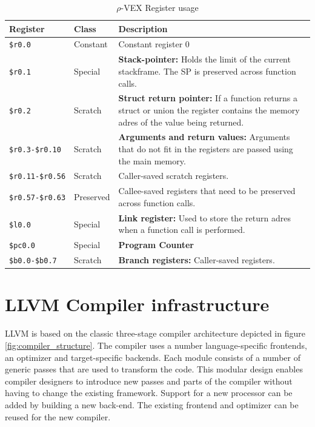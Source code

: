 \begin{table}
  \centering
    \begin{tabular}{|l|l|p{10cm}|}
    \hline
    \textbf{Register} & \textbf{Class} & \textbf{Description}   \\ \hline
    \texttt{\$r0.0}         & Constant  & Constant register 0  \\ \hline
    \texttt{\$r0.1}         & Special   & \textbf{Stack-pointer:} Holds the limit of the current stackframe. 
                                          The SP is preserved across function calls.  \\ \hline
    \texttt{\$r0.2}         & Scratch   & \textbf{Struct return pointer:} If a function returns a struct or union the register
                                          contains the memory adres of the value being returned.  \\ \hline
    \texttt{\$r0.3-\$r0.10} & Scratch   & \textbf{Arguments and return values:} Arguments that do not fit in the registers are
                                          passed using the main memory.  \\ \hline
    \texttt{\$r0.11-\$r0.56}& Scratch   & Caller-saved scratch registers.  \\ \hline
    \texttt{\$r0.57-\$r0.63}& Preserved & Callee-saved registers that need to be preserved across function calls.  \\ \hline
    \texttt{\$l0.0}         & Special   & \textbf{Link register:} Used to store the return adres when a function call is 
                                          performed.  \\ \hline
    \texttt{\$pc0.0}        & Special   & \textbf{Program Counter}  \\ \hline
    \texttt{\$b0.0-\$b0.7}  & Scratch   & \textbf{Branch registers:} Caller-saved registers.  \\ \hline
    \end{tabular}
  \caption{$\rho$-VEX Register usage \cite{Joseph-A.-Fisher:2012rm}}
  \label{tbl:rvex_reg}
\end{table}

\section{LLVM Compiler infrastructure}
LLVM is based on the classic three-stage compiler architecture depicted in figure \ref{fig:compiler_structure}. The compiler uses a number language-specific frontends, an optimizer and target-specific backends. Each module consists of a number of generic passes that are used to transform the code. This modular design enables compiler designers to introduce new passes and parts of the compiler without having to change the existing framework. Support for a new processor can be added by building a new back-end. The existing frontend and optimizer can be reused for the new compiler.

